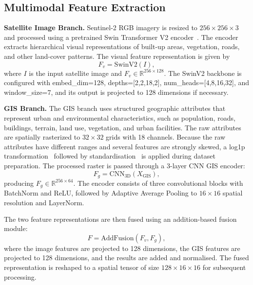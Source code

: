 \documentclass[sigconf, review=true]{acmart}
\begin{document}
\subsection{Multimodal Feature Extraction}

\textbf{Satellite Image Branch.} Sentinel-2 RGB imagery is resized to $256\times256\times3$ and processed using a pretrained Swin Transformer V2 encoder~\cite{liu2022swinv2}. The encoder extracts hierarchical visual representations of built-up areas, vegetation, roads, and other land-cover patterns. The visual feature representation is given by
\begin{equation}
  F_v = \mathrm{SwinV2}(I),
  \label{eq:swinv2}
\end{equation}
where $I$ is the input satellite image and $F_v \in \mathbb{R}^{256\times128}$. The SwinV2 backbone is configured with embed\_dim=128, depths=[2,2,18,2], num\_heads=[4,8,16,32], and window\_size=7, and its output is projected to 128 dimensions if necessary.

\textbf{GIS Branch.} The GIS branch uses structured geographic attributes that represent urban and environmental characteristics, such as population, roads, buildings, terrain, land use, vegetation, and urban facilities. The raw attributes are spatially rasterized to $32\times32$ grids with 18 channels. Because the raw attributes have different ranges and several features are strongly skewed, a log1p transformation~\cite{long1992logtransform} followed by standardisation~\cite{kotsiantis2006preprocessing} is applied during dataset preparation. The processed raster is passed through a 3-layer CNN GIS encoder:
\begin{equation}
  F_g = \mathrm{CNN_{3D}}(X_{\mathrm{GIS}}),
  \label{eq:giscnn}
\end{equation}
producing $F_g \in \mathbb{R}^{256\times64}$. The encoder consists of three convolutional blocks with BatchNorm and ReLU, followed by Adaptive Average Pooling to $16\times16$ spatial resolution and LayerNorm.

The two feature representations are then fused using an addition-based fusion module:
\begin{equation}
  F = \mathrm{AddFusion}(F_v, F_g),
  \label{eq:fusion}
\end{equation}
where the image features are projected to 128 dimensions, the GIS features are projected to 128 dimensions, and the results are added and normalised. The fused representation is reshaped to a spatial tensor of size $128\times16\times16$ for subsequent processing.
\end{document}
